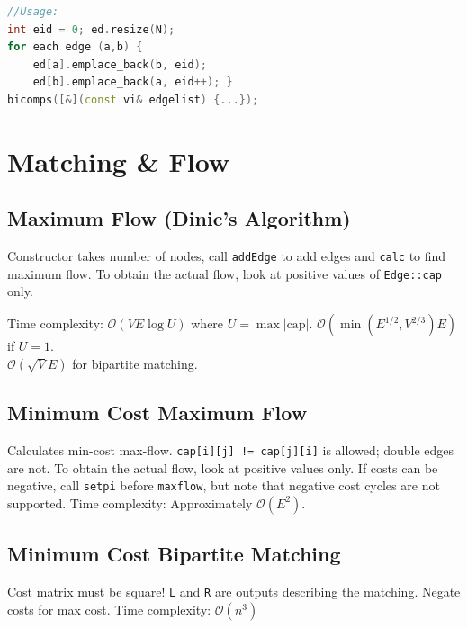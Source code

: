 \documentclass{article}
\begin{document}


\begin{lstlisting}[language=C++]
//Usage:
int eid = 0; ed.resize(N);
for each edge (a,b) {
    ed[a].emplace_back(b, eid);
    ed[b].emplace_back(a, eid++); }
bicomps([&](const vi& edgelist) {...});
\end{lstlisting}

\pagebreak

\section*{Matching \& Flow}


\subsection*{Maximum Flow (Dinic's Algorithm)}

Constructor takes number of nodes, call \texttt{addEdge} to add edges and \texttt{calc} to find maximum flow.
To obtain the actual flow, look at positive values of \texttt{Edge::cap} only.

Time complexity: $\mathcal{O}(VE\log U)$ where $U = \max |\text{cap}|$.
$\mathcal{O}(\min(E^{1/2}, V^{2/3})E)$ if $U = 1$.\\
$\mathcal{O}(\sqrt{V}E)$ for bipartite matching.



\subsection*{Minimum Cost Maximum Flow}

Calculates min-cost max-flow. \texttt{cap[i][j] != cap[j][i]} is allowed; double edges are not. To obtain the actual flow, look at positive values only.
If costs can be negative, call \texttt{setpi} before \texttt{maxflow}, but note that negative cost cycles are not supported.
Time complexity: Approximately $\mathcal{O}(E^2)$.



\pagebreak

\subsection*{Minimum Cost Bipartite Matching}
Cost matrix must be square! \texttt{L} and \texttt{R} are outputs describing the matching. Negate costs for max cost. Time complexity: $\mathcal{O}(n^3)$

\end{document}
